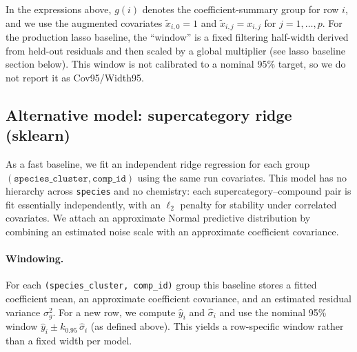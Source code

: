 \documentclass[11pt]{article}
\begin{document}
In the expressions above, $g(i)$ denotes the coefficient-summary group for row $i$, and we use the augmented covariates
$\tilde{x}_{i,0}=1$ and $\tilde{x}_{i,j}=x_{i,j}$ for $j=1,\ldots,p$.
For the production lasso baseline, the ``window'' is a fixed filtering half-width derived from held-out residuals and then
scaled by a global multiplier (see lasso baseline section below). This window is not calibrated to a nominal 95\% target,
so we do not report it as Cov95/Width95.

\subsection{Alternative model: supercategory ridge (sklearn)}

As a fast baseline, we fit an independent ridge regression for each group
$(\texttt{species\_cluster},\texttt{comp\_id})$ using the same run covariates. This model has no hierarchy across
\texttt{species} and no chemistry: each supercategory--compound pair is fit essentially independently, with an $\ell_2$
penalty for stability under correlated covariates.
We attach an approximate Normal predictive distribution by combining an estimated noise scale with an approximate
coefficient covariance.

\paragraph{Windowing.}
For each \texttt{(species\_cluster, comp\_id)} group this baseline stores a fitted coefficient mean, an approximate
coefficient covariance, and an estimated residual variance $\sigma^2_g$. For a new row, we compute $\hat{y}_i$ and
$\hat{\sigma}_i$ and use the nominal 95\% window $\hat{y}_i \pm k_{0.95}\,\hat{\sigma}_i$ (as defined above). This yields a
row-specific window rather than a fixed width per model.
\end{document}
